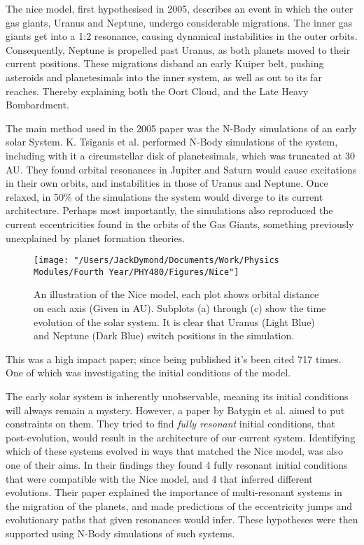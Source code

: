\documentclass[a4paper,10pt]{article}
\begin{document}
The nice model, first hypothesised in 2005\cite{Nice}, describes an event in which the outer gas giants, Uranus and Neptune, undergo considerable migrations. The inner gas giants get into a 1:2 resonance, causing dynamical instabilities in the outer orbits. Consequently, Neptune is propelled past Uranus, as both planets moved to their current positions. These migrations disband an early Kuiper belt, pushing asteroids and planetesimals into the inner system, as well as out to its far reaches. Thereby explaining both the Oort Cloud, and the Late Heavy Bombardment. 

The main method used in the 2005 paper was the N-Body simulations of an early solar System. K. Tsiganis et al. performed N-Body simulations of the system, including with it a circumstellar disk of planetesimals, which was truncated at 30 AU. They found orbital resonances in Jupiter and Saturn would cause excitations in their own orbits, and instabilities in those of Uranus and Neptune. Once relaxed, in 50\% of the simulations the system would diverge to its current architecture. Perhaps most importantly, the simulations also reproduced the current eccentricities found in the orbits of the Gas Giants, something previously unexplained by planet formation theories.

\begin{figure}[h!]
\centering
\texttt{[image: "/Users/JackDymond/Documents/Work/Physics Modules/Fourth Year/PHY480/Figures/Nice"]}
\caption{An illustration of the Nice model, each plot shows orbital distance on each axis (Given in AU). Subplots (a) through (c) show the time evolution of the solar system. It is clear that Uranus (Light Blue) and Neptune (Dark Blue) switch positions in the simulation.}
\label{NiceFig}
\end{figure}

This was a high impact paper; since being published it's been cited 717 times. One of which was investigating the initial conditions of the model. 

The early solar system is inherently unobservable, meaning its initial conditions will always remain a mystery. However, a paper by Batygin et al. aimed to put constraints on them\cite{Initial}. They tried to find \textit{fully resonant} initial conditions, that post-evolution, would result in the architecture of our current system. Identifying which of these systems evolved in ways that matched the Nice model, was also one of their aims. In their findings they found 4 fully resonant initial conditions that were compatible with the Nice model, and 4 that inferred different evolutions. Their paper explained the importance of multi-resonant systems in the migration of the planets, and made predictions of the eccentricity jumps and evolutionary paths that given resonances would infer. These hypotheses were then supported using N-Body simulations of such systems.
\end{document}
